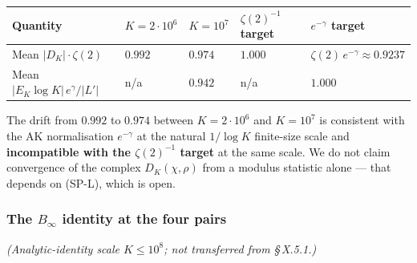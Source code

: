 {\def\LTcaptype{none} %
\begin{longtable}[]{@{}
  >{\raggedright\arraybackslash}p{}
  >{\raggedleft\arraybackslash}p{}
  >{\raggedleft\arraybackslash}p{}
  >{\raggedleft\arraybackslash}p{}
  >{\raggedleft\arraybackslash}p{}@{}}
\toprule\noalign{}
\begin{minipage}[b]{\linewidth}\raggedright
Quantity
\end{minipage} & \begin{minipage}[b]{\linewidth}\raggedleft
\(K = 2 \cdot 10^{6}\)
\end{minipage} & \begin{minipage}[b]{\linewidth}\raggedleft
\(K = 10^{7}\)
\end{minipage} & \begin{minipage}[b]{\linewidth}\raggedleft
\(\zeta(2)^{-1}\) target
\end{minipage} & \begin{minipage}[b]{\linewidth}\raggedleft
\(e^{-\gamma}\) target
\end{minipage} \\
\midrule\noalign{}
\endhead
\bottomrule\noalign{}
\endlastfoot
Mean \(|D_K| \cdot \zeta(2)\) & \(0.992\) & \(0.974\) & \(1.000\) & \(\zeta(2)\,e^{-\gamma} \approx 0.9237\) \\
Mean \(|E_K \log K|\,e^{\gamma}/|L'|\) & n/a & \(0.942\) & n/a & \(1.000\) \\
\end{longtable}
}

The drift from \(0.992\) to \(0.974\) between \(K = 2 \cdot 10^{6}\) and
\(K = 10^{7}\) is consistent with the AK normalisation \(e^{-\gamma}\)
at the natural \(1/\log K\) finite-size scale and \textbf{incompatible with
the \(\zeta(2)^{-1}\) target} at the same scale. We do not claim
convergence of the complex \(D_K(\chi,\rho)\) from a modulus statistic
alone --- that depends on (SP-L), which is open.

\subsubsection{The \(B_\infty\) identity at the four pairs}

\emph{(Analytic-identity scale \(K \le 10^{8}\); not transferred from \S\,X.5.1.)}

